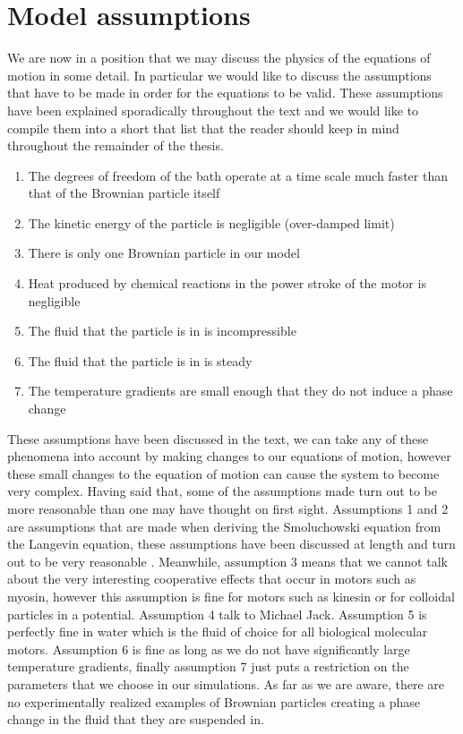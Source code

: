 \section{Model assumptions}
We are now in a position that we may discuss the physics of the equations of motion in some detail. In particular we would like to discuss the assumptions that have to be made in order for the equations to be valid. These assumptions have been explained sporadically throughout the text and we would like to compile them into a short that list that the reader should keep in mind throughout the remainder of the thesis.
\begin{enumerate}
\item{The degrees of freedom of the bath operate at a time scale much faster than that of the Brownian particle itself}
\item{The kinetic energy of the particle is negligible (over-damped limit)}
\item{There is only one Brownian particle in our model}
\item{Heat produced by chemical reactions in the power stroke of the motor is negligible}
\item{The fluid that the particle is in is incompressible}
\item{The fluid that the particle is in is steady}
\item{The temperature gradients are small enough that they do not induce a phase change}
\end{enumerate}
These assumptions have been discussed in the text, we can take any of these phenomena into account by making changes to our equations of motion, however these small changes to the equation of motion can cause the system to become very complex. Having said that, some of the assumptions made turn out to be more reasonable than one may have thought on first sight. Assumptions 1 and 2 are assumptions that are made when deriving the Smoluchowski equation from the Langevin equation, these assumptions have been discussed at length and turn out to be very reasonable \cite{Reimann2001,Gardiner2009,Einstein1905,KellerBustamante2000,Kramers1940}. Meanwhile, assumption 3 means that we cannot talk about the very interesting cooperative effects that occur in motors such as myosin, however this assumption is fine for motors such as kinesin or for colloidal particles in a potential. Assumption 4 {\color{red} talk to Michael Jack}. Assumption 5 is perfectly fine in water which is the fluid of choice for all biological molecular motors. Assumption 6 is fine as long as we do not have significantly large temperature gradients, finally assumption 7 just puts a restriction on the parameters that we choose in our simulations. As far as we are aware, there are no experimentally realized examples of Brownian particles creating a phase change in the fluid that they are suspended in.





